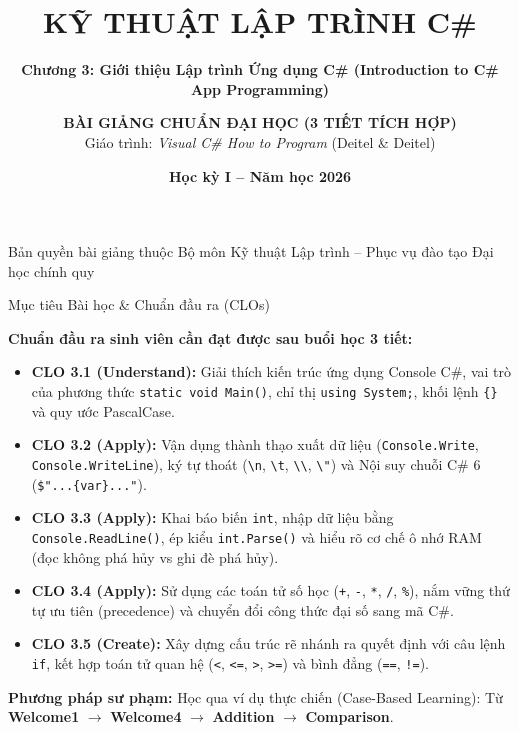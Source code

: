 \documentclass[aspectratio=169, 10pt]{beamer}
\title[\textbf{Lập trình C\# \& .NET -- Chương 3}]{\textbf{\LARGE KỸ THUẬT LẬP TRÌNH C\#}}
\subtitle{\textbf{\large Chương 3: Giới thiệu Lập trình Ứng dụng C\# (Introduction to C\# App Programming)}}
\author[\textbf{Khoa CNTT -- IT26M}]{\textbf{BÀI GIẢNG CHUẨN ĐẠI HỌC (3 TIẾT TÍCH HỢP)}\\Giáo trình: \textit{Visual C\# How to Program} (Deitel \& Deitel)}
\institute[\textbf{Lớp IT26M}]{\textbf{Khoa Công nghệ Thông tin -- Đại học Đông Á}\\\textbf{Đối tượng:} Lớp IT26M (Khóa 2026)}
\date[\textbf{2026}]{\textbf{Học kỳ I -- Năm học 2026}}
\begin{document}
\begin{frame}[plain]
  \titlepage
  \begin{center}
    \scriptsize \color{gray} Bản quyền bài giảng thuộc Bộ môn Kỹ thuật Lập trình -- Phục vụ đào tạo Đại học chính quy
  \end{center}
\end{frame}

\begin{frame}{Mục tiêu Bài học \& Chuẩn đầu ra (CLOs)}
  \begin{block}{\textbf{Chuẩn đầu ra sinh viên cần đạt được sau buổi học 3 tiết:}}
    \begin{itemize}
      \item \textbf{CLO 3.1 (Understand):} Giải thích kiến trúc ứng dụng Console C\#, vai trò của phương thức \texttt{static void Main()}, chỉ thị \texttt{using System;}, khối lệnh \texttt{\{\}} và quy ước PascalCase.
      \item \textbf{CLO 3.2 (Apply):} Vận dụng thành thạo xuất dữ liệu (\texttt{Console.Write}, \texttt{Console.WriteLine}), ký tự thoát (\texttt{\textbackslash n}, \texttt{\textbackslash t}, \texttt{\textbackslash\textbackslash}, \texttt{\textbackslash"}) và Nội suy chuỗi C\# 6 (\texttt{\$"...\{var\}..."}).
      \item \textbf{CLO 3.3 (Apply):} Khai báo biến \texttt{int}, nhập dữ liệu bằng \texttt{Console.ReadLine()}, ép kiểu \texttt{int.Parse()} và hiểu rõ cơ chế ô nhớ RAM (đọc không phá hủy vs ghi đè phá hủy).
      \item \textbf{CLO 3.4 (Apply):} Sử dụng các toán tử số học (\texttt{+}, \texttt{-}, \texttt{*}, \texttt{/}, \texttt{\%}), nắm vững thứ tự ưu tiên (precedence) và chuyển đổi công thức đại số sang mã C\#.
      \item \textbf{CLO 3.5 (Create):} Xây dựng cấu trúc rẽ nhánh ra quyết định với câu lệnh \texttt{if}, kết hợp toán tử quan hệ (\texttt{<}, \texttt{<=}, \texttt{>}, \texttt{>=}) và bình đẳng (\texttt{==}, \texttt{!=}).
    \end{itemize}
  \end{block}
  \vspace{-2mm}
  \begin{exampleblock}{\textbf{Phương pháp sư phạm:}}
    Học qua ví dụ thực chiến (Case-Based Learning): Từ \textbf{Welcome1} $\to$ \textbf{Welcome4} $\to$ \textbf{Addition} $\to$ \textbf{Comparison}.
  \end{exampleblock}
\end{frame}
\end{document}
